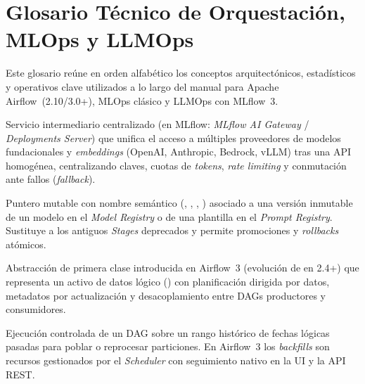 
\chapter[Glosario Técnico]{Glosario Técnico de Orquestación, MLOps y LLMOps}\label{app:glosario}

Este glosario reúne en orden alfabético los conceptos arquitectónicos, estadísticos y operativos clave utilizados a lo largo del manual para Apache Airflow~(2.10/3.0+), MLOps clásico y LLMOps con MLflow~3.

{\small
\begin{description}[style=standard, itemsep=2pt, parsep=0pt, topsep=4pt, leftmargin=1.1em, font=\sffamily\bfseries\color{PrimaryDark}]

\item[AI Gateway.]
Servicio intermediario centralizado (en MLflow: \textit{MLflow AI Gateway} / \textit{Deployments Server}) que unifica el acceso a múltiples proveedores de modelos fundacionales y \textit{embeddings} (OpenAI, Anthropic, Bedrock, vLLM) tras una API homogénea, centralizando claves, cuotas de \textit{tokens}, \textit{rate limiting} y conmutación ante fallos (\textit{fallback}).

\item[Alias (MLflow Registry).]
Puntero mutable con nombre semántico (, , , ) asociado a una versión inmutable de un modelo en el \textit{Model Registry} o de una plantilla en el \textit{Prompt Registry}. Sustituye a los antiguos \textit{Stages} deprecados y permite promociones y \textit{rollbacks} atómicos.

\item[Asset (Airflow 3).]
Abstracción de primera clase introducida en Airflow~3 (evolución de  en 2.4+) que representa un activo de datos lógico () con planificación dirigida por datos, metadatos por actualización y desacoplamiento entre DAGs productores y consumidores.

\item[Backfill.]
Ejecución controlada de un DAG sobre un rango histórico de fechas lógicas pasadas para poblar o reprocesar particiones. En Airflow~3 los \textit{backfills} son recursos gestionados por el \textit{Scheduler} con seguimiento nativo en la UI y la API REST.


\end{description}}

